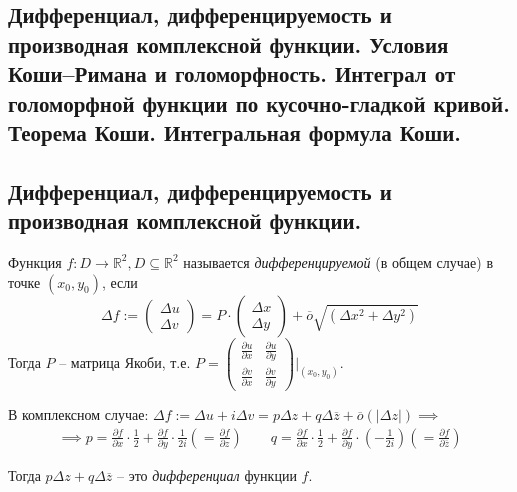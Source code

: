 \subsection{Дифференциал, дифференцируемость и производная комплексной функции. Условия Коши--Римана и голоморфность. Интеграл от голоморфной функции по кусочно-гладкой кривой. Теорема Коши. Интегральная формула Коши.}

\subsection*{Дифференциал, дифференцируемость и производная комплексной функции.}

\begin{definition*}
	Функция $f: D \to \mathbb{R}^2, D \subseteq  \mathbb{R}^2$  называется \textit{дифференцируемой} (в общем случае) в точке $(x_0, y_0)$, если 
	$$
	\Delta f:= \begin{pmatrix}
	\Delta u \\ \Delta v
	\end{pmatrix} = P \cdot \begin{pmatrix}
	\Delta x \\ \Delta y
	\end{pmatrix}
	 + \overline{o}\sqrt{(\Delta x^2 + \Delta y^2)}
	 $$  
	 Тогда $P$ -- матрица Якоби, т.е. $P = \begin{pmatrix}
	 \frac{\partial u}{\partial x} & \frac{\partial u}{\partial y} \\
	 \frac{\partial v}{\partial x} & \frac{\partial v}{\partial y}
	 \end{pmatrix}\Biggl|_{(x_0, y_0)}$.
	
\end{definition*}

 В комплексном случае: $
\Delta f := \Delta u + i \Delta v = p \Delta z + q \Delta \overline{z} + \overline{o}(|\Delta z|) \implies $ 
\begin{align*}
\implies  p = \frac{\partial f}{\partial x} \cdot \frac 12 + \frac{\partial f}{\partial y} \cdot \frac{1}{2i} \left(= \frac{\partial f}{\partial z}\right) \qquad  
q = \frac{\partial f}{\partial x} \cdot \frac 12 + \frac{\partial f}{\partial y} \cdot \left( -\frac{1}{2i} \right) \left(= \frac{\partial f}{\partial \overline{z}}\right) 
\end{align*}

\begin{definition*}
	Тогда $p \Delta z + q \Delta \overline{z} $ -- это \textit{дифференциал} функции $f$.	 
\end{definition*}

